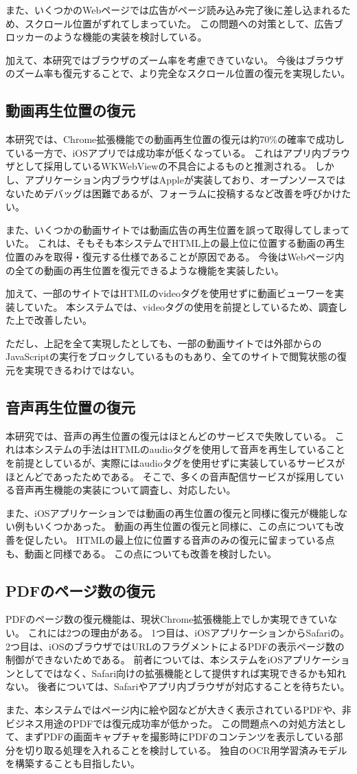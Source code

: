 また、いくつかのWebページでは広告がページ読み込み完了後に差し込まれるため、スクロール位置がずれてしまっていた。
この問題への対策として、広告ブロッカーのような機能の実装を検討している。

加えて、本研究ではブラウザのズーム率を考慮できていない。
今後はブラウザのズーム率も復元することで、より完全なスクロール位置の復元を実現したい。

\subsection{動画再生位置の復元}
本研究では、Chrome拡張機能での動画再生位置の復元は約70\%の確率で成功している一方で、iOSアプリでは成功率が低くなっている。
これはアプリ内ブラウザとして採用しているWKWebViewの不具合によるものと推測される。
しかし、アプリケーション内ブラウザはAppleが実装しており、オープンソースではないためデバッグは困難であるが、フォーラムに投稿するなど改善を呼びかけたい。

また、いくつかの動画サイトでは動画広告の再生位置を誤って取得してしまっていた。
これは、そもそも本システムでHTML上の最上位に位置する動画の再生位置のみを取得・復元する仕様であることが原因である。
今後はWebページ内の全ての動画の再生位置を復元できるような機能を実装したい。

加えて、一部のサイトではHTMLのvideoタグを使用せずに動画ビューワーを実装していた。
本システムでは、videoタグの使用を前提としているため、調査した上で改善したい。

ただし、上記を全て実現したとしても、一部の動画サイトでは外部からのJavaScriptの実行をブロックしているものもあり、全てのサイトで閲覧状態の復元を実現できるわけではない。

\subsection{音声再生位置の復元}
本研究では、音声の再生位置の復元はほとんどのサービスで失敗している。
これは本システムの手法はHTMLのaudioタグを使用して音声を再生していることを前提としているが、実際にはaudioタグを使用せずに実装しているサービスがほとんどであったためである。
そこで、多くの音声配信サービスが採用している音声再生機能の実装について調査し、対応したい。

また、iOSアプリケーションでは動画の再生位置の復元と同様に復元が機能しない例もいくつかあった。
動画の再生位置の復元と同様に、この点についても改善を促したい。
HTMLの最上位に位置する音声のみの復元に留まっている点も、動画と同様である。
この点についても改善を検討したい。

\subsection{PDFのページ数の復元}
PDFのページ数の復元機能は、現状Chrome拡張機能上でしか実現できていない。
これには2つの理由がある。
1つ目は、iOSアプリケーションからSafariの。
2つ目は、iOSのブラウザではURLのフラグメントによるPDFの表示ページ数の制御ができないためである。
前者については、本システムをiOSアプリケーションとしてではなく、Safari向けの拡張機能として提供すれば実現できるかも知れない。
後者については、Safariやアプリ内ブラウザが対応することを待ちたい。

また、本システムではページ内に絵や図などが大きく表示されているPDFや、非ビジネス用途のPDFでは復元成功率が低かった。
この問題点への対処方法として、まずPDFの画面キャプチャを撮影時にPDFのコンテンツを表示している部分を切り取る処理を入れることを検討している。
独自のOCR用学習済みモデルを構築することも目指したい。
